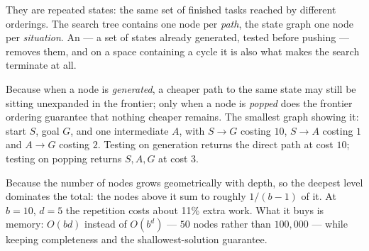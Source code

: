 \begin{ans}
  \item They are repeated states: the same set of finished tasks reached by
        different orderings. The search tree contains one node per \emph{path}, the
        state graph one node per \emph{situation}. An  --- a set
        of states already generated, tested before pushing --- removes them, and on
        a space containing a cycle it is also what makes the search terminate at
        all.
  \item Because when a node is \emph{generated}, a cheaper path to the same state
        may still be sitting unexpanded in the frontier; only when a node is
        \emph{popped} does the frontier ordering guarantee that nothing cheaper
        remains. The smallest graph showing it: start $S$, goal $G$, and one
        intermediate $A$, with $S \to G$ costing $10$, $S \to A$ costing $1$ and
        $A \to G$ costing $2$. Testing on generation returns the direct path at
        cost $10$; testing on popping returns $S,A,G$ at cost $3$.
  \item Because the number of nodes grows geometrically with depth, so the deepest
        level dominates the total: the nodes above it sum to roughly
        $1/(b-1)$ of it. At $b=10$, $d=5$ the repetition costs about 11\% extra
        work. What it buys is memory: $O(bd)$ instead of $O(b^{d})$ --- $50$ nodes
        rather than $100{,}000$ --- while keeping completeness and the
        shallowest-solution guarantee.
\end{ans}

